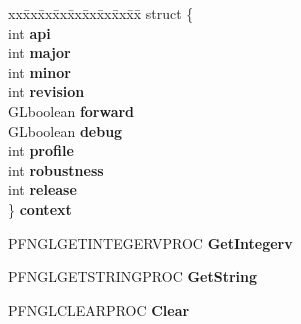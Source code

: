 \begin{DoxyCompactItemize}
\item 
\hypertarget{struct__GLFWwindow_a52222772c43bcddd17e49a84a5623518}{}\begin{tabbing}
xx\=xx\=xx\=xx\=xx\=xx\=xx\=xx\=xx\=\kill
struct \{\\
\>int {\bfseries api}\\
\>int {\bfseries major}\\
\>int {\bfseries minor}\\
\>int {\bfseries revision}\\
\>GLboolean {\bfseries forward}\\
\>GLboolean {\bfseries debug}\\
\>int {\bfseries profile}\\
\>int {\bfseries robustness}\\
\>int {\bfseries release}\\
\} {\bfseries context}\label{struct__GLFWwindow_a52222772c43bcddd17e49a84a5623518}
\\

\end{tabbing}\item 
\hypertarget{struct__GLFWwindow_ace9ba37acf0a6d6b868e9723dc3d26b3}{}P\+F\+N\+G\+L\+G\+E\+T\+I\+N\+T\+E\+G\+E\+R\+V\+P\+R\+O\+C {\bfseries Get\+Integerv}\label{struct__GLFWwindow_ace9ba37acf0a6d6b868e9723dc3d26b3}

\item 
\hypertarget{struct__GLFWwindow_ad61be7ad47b55ed7637e98eb811c8896}{}P\+F\+N\+G\+L\+G\+E\+T\+S\+T\+R\+I\+N\+G\+P\+R\+O\+C {\bfseries Get\+String}\label{struct__GLFWwindow_ad61be7ad47b55ed7637e98eb811c8896}

\item 
\hypertarget{struct__GLFWwindow_a4e77e4a234200f48c73f18de0d0ec53e}{}P\+F\+N\+G\+L\+C\+L\+E\+A\+R\+P\+R\+O\+C {\bfseries Clear}\label{struct__GLFWwindow_a4e77e4a234200f48c73f18de0d0ec53e}


\end{DoxyCompactItemize}
